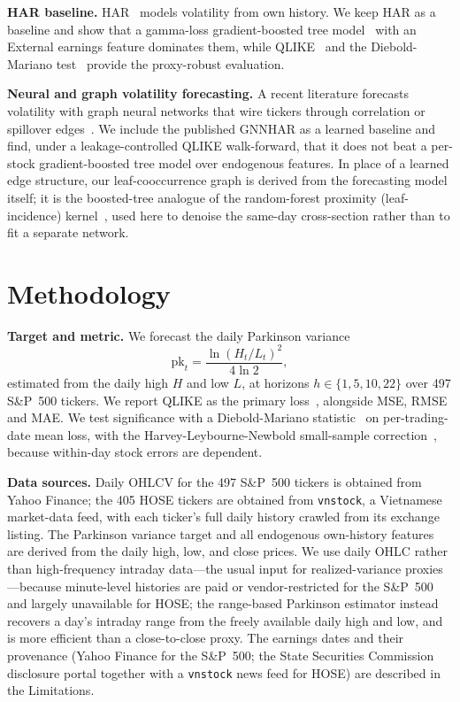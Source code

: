 \documentclass[runningheads]{llncs}
\begin{document}
\textbf{HAR baseline.} HAR~\cite{corsi2009} models volatility from
own history. We keep HAR as a baseline and show that a
gamma-loss gradient-boosted tree model~\cite{friedman2001,chen2016} with an External earnings feature
dominates them, while QLIKE~\cite{patton2011} and the Diebold-Mariano
test~\cite{dm1995,hln1997} provide the proxy-robust evaluation.

\textbf{Neural and graph volatility forecasting.} A recent literature forecasts volatility with graph
neural networks that wire tickers through correlation or spillover edges~\cite{gnnhar2024}. We include the
published GNNHAR as a learned baseline and find, under a leakage-controlled QLIKE walk-forward, that it
does not beat a per-stock gradient-boosted tree model over endogenous features. In place of a learned
edge structure, our leaf-cooccurrence graph is derived from the forecasting model itself; it is the
boosted-tree analogue of the random-forest proximity (leaf-incidence) kernel~\cite{rhodes2023}, used
here to denoise the same-day cross-section rather than to fit a separate network.

\FloatBarrier

\section{Methodology}
\indent\textbf{Target and metric.} We forecast the daily Parkinson variance
\[\mathrm{pk}_t=\frac{\ln(H_t/L_t)^2}{4\ln 2},\]
estimated from the daily high $H$ and low $L$, at horizons $h\in\{1,5,10,22\}$ over 497 S\&P~500 tickers. We report QLIKE as the
primary loss~\cite{patton2011}, alongside MSE, RMSE and MAE. We test significance with a
Diebold-Mariano statistic~\cite{dm1995} on per-trading-date mean loss, with the
Harvey-Leybourne-Newbold small-sample correction~\cite{hln1997}, because within-day stock errors are
dependent.

\textbf{Data sources.} Daily OHLCV for the 497 S\&P~500 tickers is obtained from Yahoo Finance;
the 405 HOSE tickers are obtained from \texttt{vnstock}, a
Vietnamese market-data feed, with each ticker's full daily history crawled from its exchange listing. The
Parkinson variance target and all endogenous own-history features are derived from the daily high, low,
and close prices. We use daily OHLC rather than high-frequency intraday data---the usual input for
realized-variance proxies---because minute-level histories are paid or vendor-restricted for the
S\&P~500 and largely unavailable for HOSE; the range-based Parkinson estimator instead recovers a day's
intraday range from the freely available daily high and low, and is more efficient than a close-to-close
proxy. The earnings dates and their provenance (Yahoo Finance for the S\&P~500; the State
Securities Commission disclosure portal together with a \texttt{vnstock} news feed for HOSE) are described
in the Limitations.
\end{document}
